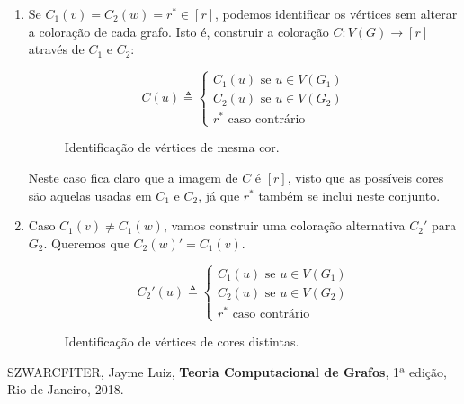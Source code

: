 \documentclass{homework}
\begin{document}
	\begin{enumerate}[label=\Roman*.]
		\item Se $C_1(v) = C_2(w) = r^{\ast} \in [r]$, podemos identificar os vértices sem alterar a coloração de cada grafo. Isto é, construir a coloração $C : V(G) \to [r]$ através de $C_1$ e $C_2$: \par
		
		$$C(u) \triangleq \begin{cases}
		C_1(u) \text{ se } u \in V(G_1)\\
		C_2(u) \text{ se } u \in V(G_2)\\
		r^{\ast} \text{ caso contrário}
		\end{cases}$$
		
		\begin{figure}[H]
			\centering
			
			\caption{Identificação de vértices de mesma cor.}
			\label{fig:2.2}
		\end{figure}
		
		Neste caso fica claro que a imagem de $C$ é $[r]$, visto que as possíveis cores são aquelas usadas em $C_1$ e $C_2$, já que $r^{\ast}$ também se inclui neste conjunto.\par
		
		\item Caso $C_1(v) \neq C_1(w)$, vamos construir uma coloração alternativa $C_2'$ para $G_2$. Queremos que $C_2(w)' = C_1(v)$.
		
		$$C_2'(u) \triangleq \begin{cases}
		C_1(u) \text{ se } u \in V(G_1)\\
		C_2(u) \text{ se } u \in V(G_2)\\
		r^{\ast} \text{ caso contrário}
		\end{cases}$$
		
		\begin{figure}[H]
			\centering
			
			\caption{Identificação de vértices de cores distintas.}
			\label{fig:2.3}
		\end{figure}
		
	\end{enumerate}
	
	\quest
	\begin{thebibliography}{10}
		 SZWARCFITER, Jayme Luiz, \textbf{Teoria Computacional de Grafos}, 1ª edição, Rio de Janeiro, 2018.
	\end{thebibliography}
	
\end{document}
